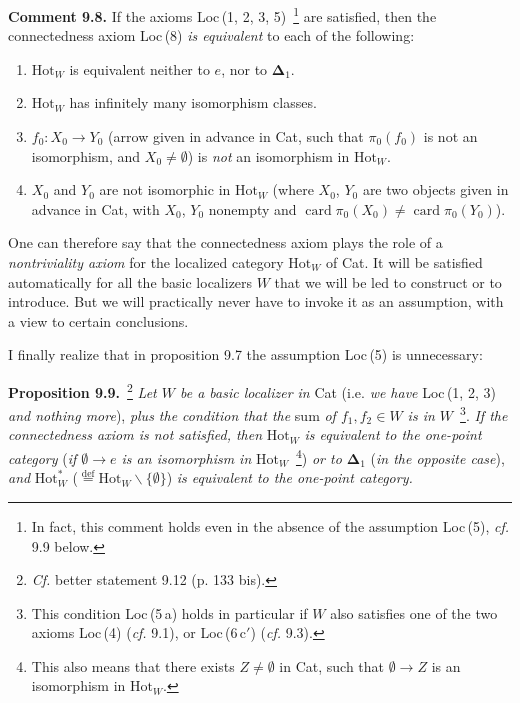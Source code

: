 \documentclass[11pt]{article}
\newcommand{\printedpage}[1]{\marginpar{\footnotesize p.~#1}}
\newcommand{\msp}[1]{\marginpar{\footnotesize [#1]}}
\newcommand{\marginbar}{\marginpar{$\Vert$}}
\newcommand{\Hot}{\mathrm{Hot}}
\newcommand{\card}{\operatorname{card}}
\begin{document}
\msp{page 130}\textbf{Comment 9.8.} If the axioms Loc\,(1, 2, 3, 5)~\footnote[52]{In fact, this comment holds even in the absence of the assumption Loc\,(5), \textit{cf.} 9.9 below.} are satisfied, then the connectedness axiom Loc\,(8) \textit{is equivalent} to each of the following:

\printedpage{70}
\begin{enumerate}[leftmargin=*]
\item[\textit{a})] $\Hot_W$ is equivalent neither to $e$, nor to $\boldsymbol{\Delta}_1$.
\item[\textit{b})] $\Hot_W$ has infinitely many isomorphism classes.
\item[\textit{c})] $f_0:X_0\longrightarrow Y_0$ (arrow given in advance in Cat, such that $\pi_0(f_0)$ is not an isomorphism, and $X_0\neq\emptyset$) is \textit{not} an isomorphism in $\Hot_W$.
\item[\textit{d})] $X_0$ and $Y_0$ are not isomorphic in $\Hot_W$ (where $X_0$, $Y_0$ are two objects given in advance in Cat, with $X_0$, $Y_0$ nonempty and $\card\pi_0(X_0)\neq\card\pi_0(Y_0)$).
\end{enumerate}

\marginbar One can therefore say that the connectedness axiom plays the role of a \textit{nontriviality axiom} for the localized category $\Hot_W$ of Cat. It will be satisfied automatically for all the basic localizers $W$ that we will be led to construct or to introduce. But we will practically never have to invoke it as an assumption, with a view to certain conclusions.

I finally realize that in proposition 9.7 the assumption Loc\,(5) is unnecessary:

\textbf{Proposition 9.9.}~\footnote[53]{\textit{Cf.} better statement 9.12 (p. 133 bis).} \textit{Let $W$ be a basic localizer in} Cat (i.e. \textit{we have} Loc\,(1, 2, 3) \textit{and nothing more}), \textit{plus the condition that the} sum \textit{of $f_1,f_2\in W$ is in $W$}~\footnote[54]{This condition Loc\,(5\,a) holds in particular if $W$ also satisfies one of the two axioms Loc\,(4) (\textit{cf.} 9.1), or Loc\,(6\,c$'$) (\textit{cf.} 9.3).}. \textit{If the connectedness axiom is not satisfied, then} $\Hot_W$ \textit{is equivalent to the one-point category} (\textit{if $\emptyset\longrightarrow e$ is an isomorphism in} $\Hot_W$~\footnote[55]{This also means that there exists $Z\neq\emptyset$ in Cat, such that $\emptyset\longrightarrow Z$ is an isomorphism in $\Hot_W$.}) \textit{or to $\boldsymbol{\Delta}_1$} (\textit{in the opposite case}), \textit{and} $\Hot_W^*$ ($\overset{\text{def}}{=}\Hot_W\backslash\{\emptyset\}$) \textit{is equivalent to the one-point category.}
\end{document}
